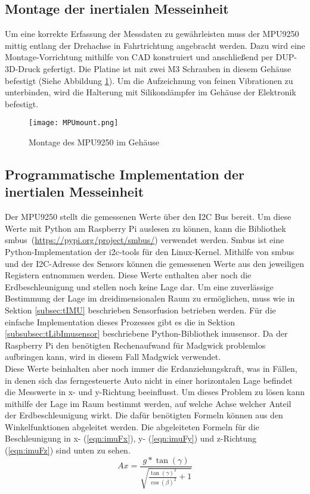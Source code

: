 \subsection{Montage der inertialen Messeinheit}
\label{subsec:IMUmount}
Um eine korrekte Erfassung der Messdaten zu gewährleisten muss der MPU9250 mittig entlang der Drehachse in Fahrtrichtung angebracht werden. Dazu wird eine Montage-Vorrichtung mithilfe von \ac{CAD} konstruiert und anschließend per \ac{DUP}-3D-Druck gefertigt. Die Platine ist mit zwei M3 Schrauben in diesem Gehäuse befestigt (Siehe Abbildung \ref{fig:MPUmount}). Um die Aufzeichnung von feinen Vibrationen zu unterbinden, wird die Halterung mit Silikondämpfer im Gehäuse der Elektronik befestigt. 
\begin{figure}[h]
\centering
\texttt{[image: MPUmount.png]}
\caption{Montage des MPU9250 im Gehäuse}
\label{fig:MPUmount}
\end{figure}

\subsection{Programmatische Implementation der inertialen Messeinheit}
\label{subsec:IMUprogram}
Der MPU9250 stellt die gemessenen Werte über den \ac{I2C} Bus bereit. Um diese Werte mit Python am Raspberry Pi auslesen zu können, kann die Bibliothek \glqq smbus\grqq \ (\url{https://pypi.org/project/smbus/}) verwendet werden. Smbus ist eine Python-Implementation der i2c-tools für den Linux-Kernel. Mithilfe von smbus und der \ac{I2C}-Adresse des Sensors können die gemessenen Werte aus den jeweiligen Registern entnommen werden. Diese Werte enthalten aber noch die Erdbeschleunigung und stellen noch keine Lage dar. Um eine zuverlässige Bestimmung der Lage im dreidimensionalen Raum zu ermöglichen, muss wie in Sektion \ref{subsec:tIMU} beschrieben Sensorfusion betrieben werden. Für die einfache Implementation dieses Prozesses gibt es die in Sektion \ref{subsubsec:tLibImusensor} beschriebene Python-Bibliothek \glqq imusensor\grqq . Da der Raspberry Pi den benötigten Rechenaufwand für Madgwick problemlos aufbringen kann, wird in diesem Fall Madgwick verwendet. \\
Diese Werte beinhalten aber noch immer die Erdanziehungskraft, was in Fällen, in denen sich das ferngesteuerte Auto nicht in einer horizontalen Lage befindet die Messwerte in x- und y-Richtung beeinflusst. Um dieses Problem zu lösen kann mithilfe der Lage im Raum bestimmt werden, auf welche Achse welcher Anteil der Erdbeschleunigung  wirkt. Die dafür benötigten Formeln können aus den Winkelfunktionen abgeleitet werden.
Die abgeleiteten Formeln für die Beschleunigung in x- (\ref{eqn:imuFx}), y- (\ref{eqn:imuFy}) und z-Richtung (\ref{eqn:imuFz}) sind unten zu sehen.
\begin{equation}
Ax=\frac{g*\tan(\gamma)}{\sqrt{\frac{\tan(\gamma)^2}{\cos(\beta)^2}+1}}
\label{eqn:imuFx}
\end{equation}

